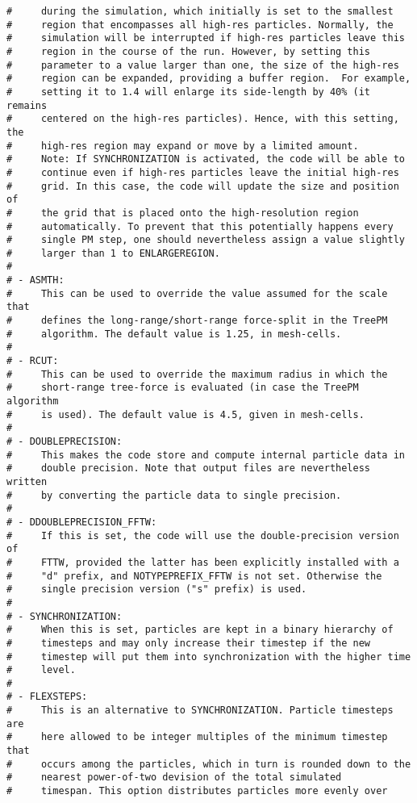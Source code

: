 \documentclass[a4paper,english,10.5pt]{scrartcl}
\begin{document}
\begin{verbatim}
#     during the simulation, which initially is set to the smallest
#     region that encompasses all high-res particles. Normally, the
#     simulation will be interrupted if high-res particles leave this
#     region in the course of the run. However, by setting this
#     parameter to a value larger than one, the size of the high-res
#     region can be expanded, providing a buffer region.  For example, 
#     setting it to 1.4 will enlarge its side-length by 40% (it remains
#     centered on the high-res particles). Hence, with this setting, the 
#     high-res region may expand or move by a limited amount. 
#     Note: If SYNCHRONIZATION is activated, the code will be able to
#     continue even if high-res particles leave the initial high-res
#     grid. In this case, the code will update the size and position of
#     the grid that is placed onto the high-resolution region
#     automatically. To prevent that this potentially happens every
#     single PM step, one should nevertheless assign a value slightly
#     larger than 1 to ENLARGEREGION.
#
# - ASMTH: 
#     This can be used to override the value assumed for the scale that
#     defines the long-range/short-range force-split in the TreePM
#     algorithm. The default value is 1.25, in mesh-cells.
#
# - RCUT: 
#     This can be used to override the maximum radius in which the
#     short-range tree-force is evaluated (in case the TreePM algorithm
#     is used). The default value is 4.5, given in mesh-cells.
#
# - DOUBLEPRECISION: 
#     This makes the code store and compute internal particle data in
#     double precision. Note that output files are nevertheless written
#     by converting the particle data to single precision.
#
# - DDOUBLEPRECISION_FFTW:
#     If this is set, the code will use the double-precision version of
#     FTTW, provided the latter has been explicitly installed with a
#     "d" prefix, and NOTYPEPREFIX_FFTW is not set. Otherwise the
#     single precision version ("s" prefix) is used.
#
# - SYNCHRONIZATION: 
#     When this is set, particles are kept in a binary hierarchy of
#     timesteps and may only increase their timestep if the new
#     timestep will put them into synchronization with the higher time
#     level.
#
# - FLEXSTEPS: 
#     This is an alternative to SYNCHRONIZATION. Particle timesteps are
#     here allowed to be integer multiples of the minimum timestep that
#     occurs among the particles, which in turn is rounded down to the
#     nearest power-of-two devision of the total simulated
#     timespan. This option distributes particles more evenly over

\end{verbatim}
\end{document}
